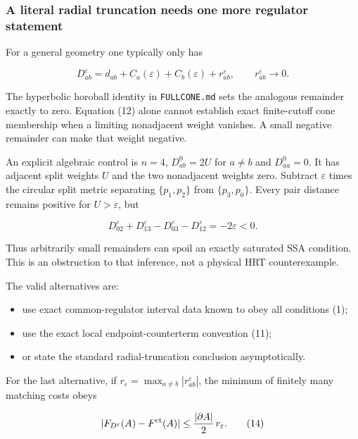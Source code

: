 \documentclass[11pt]{article}
\providecommand{\tightlist}{\setlength{\itemsep}{1pt}\setlength{\parskip}{0pt}}
\begin{document}
\subsubsection{A literal radial truncation needs one more regulator
statement}\label{a-literal-radial-truncation-needs-one-more-regulator-statement}

For a general geometry one typically only has

\[
D^{\varepsilon}_{ab}
=d_{ab}+C_a(\varepsilon)+C_b(\varepsilon)+r^{\varepsilon}_{ab},
\qquad r^{\varepsilon}_{ab}\longrightarrow0.                  \tag{12}
\]

The hyperbolic horoball identity in \texttt{FULLCONE.md} sets the
analogous remainder exactly to zero. Equation (12) alone cannot
establish exact finite-cutoff cone membership when a limiting
nonadjacent weight vanishes. A small negative remainder can make that
weight negative.

An explicit algebraic control is \(n=4\), \(D^0_{ab}=2U\) for \(a\ne b\)
and \(D^0_{aa}=0\). It has adjacent split weights \(U\) and the two
nonadjacent weights zero. Subtract \(\varepsilon\) times the circular
split metric separating \(\{p_1,p_2\}\) from \(\{p_3,p_0\}\). Every pair
distance remains positive for \(U>\varepsilon\), but

\[
D^{\varepsilon}_{02}+D^{\varepsilon}_{13}
-D^{\varepsilon}_{03}-D^{\varepsilon}_{12}=-2\varepsilon<0.   \tag{13}
\]

Thus arbitrarily small remainders can spoil an exactly saturated SSA
condition. This is an obstruction to that inference, not a physical HRT
counterexample.

The valid alternatives are:

\begin{itemize}
\tightlist
\item
  use exact common-regulator interval data known to obey all conditions
  (1);
\item
  use the exact local endpoint-counterterm convention (11);
\item
  or state the standard radial-truncation conclusion asymptotically.
\end{itemize}

For the last alternative, if
\(r_\varepsilon=\max_{a\ne b}|r^\varepsilon_{ab}|\), the minimum of
finitely many matching costs obeys

\[
|F_{D^\varepsilon}(A)-F^{\rm ct}(A)|
\leq\frac{|\partial A|}{2}\,r_\varepsilon.                  \tag{14}
\]
\end{document}
